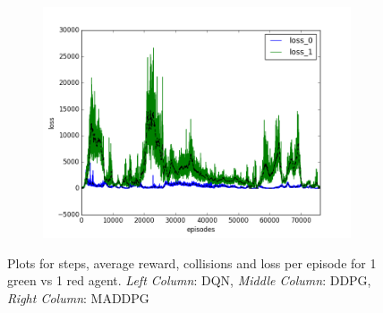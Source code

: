 \begin{figure}[t]
\begin{subfigure}[t]{\figscale\linewidth}
    \includegraphics[width=1.5\textwidth]
    {../results/maddpg_1vs1/loss.png}
    \label{fig:maddpg-1vs1-loss}
  \end{subfigure}

  \caption{Plots for steps, average reward, collisions and loss per episode for 1 green vs 1 red agent. \textit{Left Column}: DQN, \textit{Middle Column}: DDPG, \textit{Right Column}: MADDPG}
  \label{fig:1vs1}
\end{figure}
\FloatBarrier

